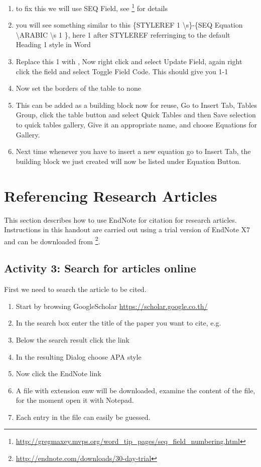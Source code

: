 \begin{enumerate}
\begin{figure}[h]
 \end{figure}
 \item to fix this we will use SEQ Field, see \footnote{\url{http://gregmaxey.mvps.org/word_tip_pages/seq_field_numbering.html}} for details
 \item you will see something similar to this \{STYLEREF 1 \textbackslash s\}-\{SEQ Equation \textbackslash * ARABIC \textbackslash  s 1 \}, here 1 after STYLEREF referringing to the default Heading 1 style in Word
 \item Replace this 1 with  , Now right click and select Update Field, again right click the field and select Toggle Field Code. This should give you 1-1 
 \item Now set the borders of the table to none
 \item This can be added as a building block now for reuse, Go to Insert Tab, Tables Group, click the table button and select Quick Tables and then Save selection to quick tables gallery, Give it an appropriate name, and choose Equations for Gallery.
 \item Next time whenever you have to insert a new equation go to Insert Tab, the building block we just created will now be listed under Equation Button.
 \end{enumerate}
 \section{Referencing Research Articles}
 This section describes how to use EndNote for citation for research articles.
 Instructions in this handout are carried out using a trial version of EndNote X7 and can be downloaded from \footnote{\url{http://endnote.com/downloads/30-day-trial}}. 
 \subsection{Activity 3: Search for articles online}
 \label{subsec:activity3}
 First we need to search the article to be cited.
 \begin{enumerate}
 \item Start by browsing GoogleScholar \url{https://scholar.google.co.th/}
 \item In the search box enter the title of the paper you want to cite, e.g. 
 \item Below the search result click the link 
 \item In the resulting Dialog choose APA style
 \item Now click the EndNote link
 \item A file with extension enw will be downloaded, examine the content of the file, for the moment open it with Notepad.
 \item Each entry in the file can easily be guessed.
 \end{enumerate}
